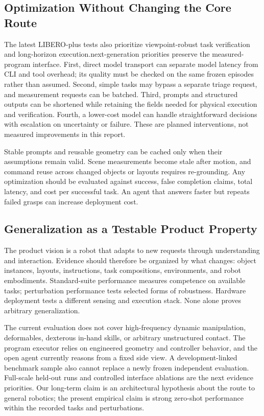 \subsection{Optimization Without Changing the Core Route}
The latest LIBERO-plus tests also prioritize viewpoint-robust task verification and long-horizon execution.\n\nOur next-generation priorities preserve the measured-program interface. First, direct model transport can separate model latency from CLI and tool overhead; its quality must be checked on the same frozen episodes rather than assumed. Second, simple tasks may bypass a separate triage request, and measurement requests can be batched. Third, prompts and structured outputs can be shortened while retaining the fields needed for physical execution and verification. Fourth, a lower-cost model can handle straightforward decisions with escalation on uncertainty or failure. These are planned interventions, not measured improvements in this report.

Stable prompts and reusable geometry can be cached only when their assumptions remain valid. Scene measurements become stale after motion, and command reuse across changed objects or layouts requires re-grounding. Any optimization should be evaluated against success, false completion claims, total latency, and cost per successful task. An agent that answers faster but repeats failed grasps can increase deployment cost.

\subsection{Generalization as a Testable Product Property}
The product vision is a robot that adapts to new requests through understanding and interaction. Evidence should therefore be organized by what changes: object instances, layouts, instructions, task compositions, environments, and robot embodiments. Standard-suite performance measures competence on available tasks; perturbation performance tests selected forms of robustness. Hardware deployment tests a different sensing and execution stack. None alone proves arbitrary generalization.

The current evaluation does not cover high-frequency dynamic manipulation, deformables, dexterous in-hand skills, or arbitrary unstructured contact. The program executor relies on engineered geometry and controller behavior, and the open agent currently reasons from a fixed side view. A development-linked benchmark sample also cannot replace a newly frozen independent evaluation. Full-scale held-out runs and controlled interface ablations are the next evidence priorities. Our long-term claim is an architectural hypothesis about the route to general robotics; the present empirical claim is strong zero-shot performance within the recorded tasks and perturbations.
